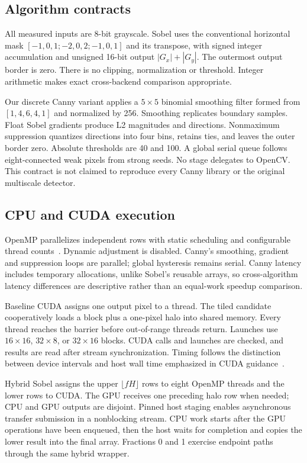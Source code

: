 \documentclass[conference]{IEEEtran}
\begin{document}
\subsection{Algorithm contracts}
All measured inputs are 8-bit grayscale. Sobel uses the conventional horizontal mask $[-1,0,1;-2,0,2;-1,0,1]$ and its transpose, with signed integer accumulation and unsigned 16-bit output $|G_x|+|G_y|$. The outermost output border is zero. There is no clipping, normalization or threshold. Integer arithmetic makes exact cross-backend comparison appropriate.

Our discrete Canny variant applies a $5\times5$ binomial smoothing filter formed from $[1,4,6,4,1]$ and normalized by 256. Smoothing replicates boundary samples. Float Sobel gradients produce L2 magnitudes and directions. Nonmaximum suppression quantizes directions into four bins, retains ties, and leaves the outer border zero. Absolute thresholds are 40 and 100. A global serial queue follows eight-connected weak pixels from strong seeds. No stage delegates to OpenCV. This contract is not claimed to reproduce every Canny library or the original multiscale detector.

\subsection{CPU and CUDA execution}
OpenMP parallelizes independent rows with static scheduling and configurable thread counts~\cite{openmp}. Dynamic adjustment is disabled. Canny's smoothing, gradient and suppression loops are parallel; global hysteresis remains serial. Canny latency includes temporary allocations, unlike Sobel's reusable arrays, so cross-algorithm latency differences are descriptive rather than an equal-work speedup comparison.

Baseline CUDA assigns one output pixel to a thread. The tiled candidate cooperatively loads a block plus a one-pixel halo into shared memory. Every thread reaches the barrier before out-of-range threads return. Launches use $16\times16$, $32\times8$, or $32\times16$ blocks. CUDA calls and launches are checked, and results are read after stream synchronization. Timing follows the distinction between device intervals and host wall time emphasized in CUDA guidance~\cite{cudaGuide}.

Hybrid Sobel assigns the upper $\lfloor fH\rfloor$ rows to eight OpenMP threads and the lower rows to CUDA. The GPU receives one preceding halo row when needed; CPU and GPU outputs are disjoint. Pinned host staging enables asynchronous transfer submission in a nonblocking stream. CPU work starts after the GPU operations have been enqueued, then the host waits for completion and copies the lower result into the final array. Fractions 0 and 1 exercise endpoint paths through the same hybrid wrapper.
\end{document}
